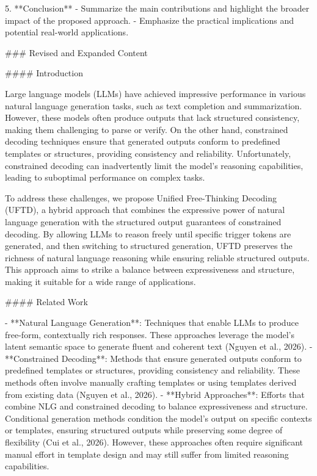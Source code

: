 5. **Conclusion**
   - Summarize the main contributions and highlight the broader impact of the proposed approach.
   - Emphasize the practical implications and potential real-world applications.

### Revised and Expanded Content

#### Introduction

Large language models (LLMs) have achieved impressive performance in various natural language generation tasks, such as text completion and summarization. However, these models often produce outputs that lack structured consistency, making them challenging to parse or verify. On the other hand, constrained decoding techniques ensure that generated outputs conform to predefined templates or structures, providing consistency and reliability. Unfortunately, constrained decoding can inadvertently limit the model's reasoning capabilities, leading to suboptimal performance on complex tasks.

To address these challenges, we propose Unified Free-Thinking Decoding (UFTD), a hybrid approach that combines the expressive power of natural language generation with the structured output guarantees of constrained decoding. By allowing LLMs to reason freely until specific trigger tokens are generated, and then switching to structured generation, UFTD preserves the richness of natural language reasoning while ensuring reliable structured outputs. This approach aims to strike a balance between expressiveness and structure, making it suitable for a wide range of applications.

#### Related Work

- **Natural Language Generation**: Techniques that enable LLMs to produce free-form, contextually rich responses. These approaches leverage the model's latent semantic space to generate fluent and coherent text (Nguyen et al., 2026).
- **Constrained Decoding**: Methods that ensure generated outputs conform to predefined templates or structures, providing consistency and reliability. These methods often involve manually crafting templates or using templates derived from existing data (Nguyen et al., 2026).
- **Hybrid Approaches**: Efforts that combine NLG and constrained decoding to balance expressiveness and structure. Conditional generation methods condition the model’s output on specific contexts or templates, ensuring structured outputs while preserving some degree of flexibility (Cui et al., 2026). However, these approaches often require significant manual effort in template design and may still suffer from limited reasoning capabilities.

